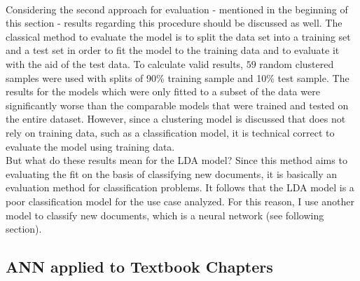 \documentclass[11pt,a4paper]{article}
\begin{document}
\ \\
Considering the second approach for evaluation - mentioned in the beginning of this section - results regarding this procedure should be discussed as well. The classical method to evaluate the model is to split the data set into a training set and a test set in order to fit the model to the training data and to evaluate it with the aid of the test data. To calculate valid results, $59$ random clustered samples were used with splits of 90\% training sample and 10\% test sample. The results for the models which were only fitted to a subset of the data were significantly worse than the comparable models that were trained and tested on the entire dataset. However, since a clustering model is discussed that does not rely on training data, such as a classification model, it is technical correct to evaluate the model using training data.\\
But what do these results mean for the LDA model? Since this method aims to evaluating the fit on the basis of classifying new documents, it is basically an evaluation method for classification problems. It follows that the LDA model is a poor classification model for the use case analyzed. For this reason, I use another model to classify new documents, which is a neural network (see following section).

\subsection{ANN applied to Textbook Chapters} \label{sec:ANN.example}
\end{document}
